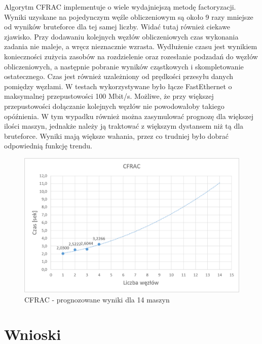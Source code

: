 \documentclass{article}
\begin{document}
Algorytm CFRAC implementuje o wiele wydajniejszą metodę factoryzacji. Wyniki uzyskane na pojedynczym węźle obliczeniowym są około 9 razy mniejsze od wyników bruteforce dla tej samej liczby. Widać tutaj również ciekawe zjawisko. Przy dodawaniu kolejnych węzłów obliczeniowych czas wykonania zadania nie maleje, a wręcz nieznacznie wzrasta. Wydłużenie czasu jest wynikiem konieczności zużycia zasobów na rozdzielenie oraz rozesłanie podzadań do węzłów obliczeniowych, a następnie pobranie wyników cząstkowych i skompletowanie ostatecznego. Czas jest również uzależniony od prędkości przesyłu danych pomiędzy węzłami. W testach wykorzystywane było łącze FastEthernet o maksymalnej przepustowości 100 Mbit/s. Możliwe, że przy większej przepustowości dołączanie kolejnych węzłów nie powodowałoby takiego opóźnienia. W tym wypadku również można zasymulować prognozę dla większej ilości maszyn, jednakże należy ją traktować z większym dystansem niż tą dla bruteforce. Wyniki mają większe wahania, przez co trudniej było dobrać odpowiednią funkcję trendu.


\begin{figure}[h!]
    \includegraphics[width=\linewidth]{CFRAC_prognoza.png}
    \caption{CFRAC - prognozowane wyniki dla 14 maszyn}
    \label{fig:userpagescr}
\end{figure}
\newpage
\section{Wnioski}
\end{document}
